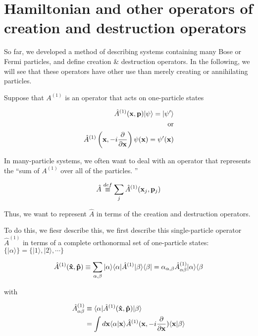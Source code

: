 ﻿\documentclass[twoside]{book}
\numberwithin{equation}{section}
\begin{document}
\section{Hamiltonian and other operators of creation and destruction operators}

So far, we developed a method of describing systems containing many Bose or Fermi particles, and define creation \& destruction operators. In the following, we will see that these operators have other use than merely creating or annihilating particles. 

Suppose that $A^{(1)}$ is an operator that acts on one-particle states

\begin{align}
\begin{split}
\hat{A}^{(1)}({\bf x},{\bf p})|\psi\rangle = |\psi'\rangle \\
\text{or}\\
\hat{A}^{(1)}\left({\bf x},-i\frac{\partial}{\partial {\bf x}}\right)\psi({\bf x}) = \psi'({\bf x})
\end{split}
\end{align}

In many-particle systems, we often want to deal with an operator that represents the ``sum of $A^{(1)}$ over all of the particles. ''

\begin{align}
\hat{A}\overset{def}{\equiv}\sum_j\hat{A}^{(1)}({\bf x}_j,{\bf p}_j)
\end{align}

Thus, we want to represent $\hat{A}$ in terms of the creation and destruction operators. 

To do this, we fiesr describe this, we first describe this single-particle operator $\hat{A}^{(1)}$ in terms of a complete orthonormal set of one-particle states: $\{|\alpha\rangle\} = \{|1\rangle,|2\rangle,\cdots\}$

\begin{align}
\hat{A}^{(1)}({\bf \hat{x}, \hat{p}}) \equiv \sum_{\alpha,\beta}|\alpha\rangle\langle\alpha| \hat{A}^{(1)}|\beta\rangle\langle\beta| = \alpha_{\alpha,\beta}\hat{A}^{(1)}_{\alpha\beta}|\alpha\rangle\langle\beta
\end{align}

with

\begin{align}
\begin{split}
\hat{A}^{(1)}_{\alpha\beta} &\equiv\langle\alpha|\hat{A}^{(1)}({\bf \hat{x},\hat{p}})|\beta\rangle \\
&=\int d{\bf x} \langle\alpha|{\bf x}\rangle\hat{A}^{(1)}({\bf x}, -i\frac{\partial}{\partial{\bf x}})\langle{\bf x}|\beta\rangle
\end{split}
\end{align}
\end{document}
